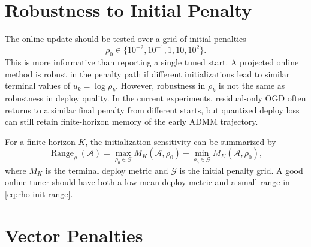 \documentclass[11pt]{article}
\begin{document}
\section{Robustness to Initial Penalty}

The online update should be tested over a grid of initial penalties
\[
    \rho_0\in\{10^{-2},10^{-1},1,10,10^2\}.
\]
This is more informative than reporting a single tuned start.  A projected
online method is robust in the penalty path if different initializations lead
to similar terminal values of \(u_k=\log\rho_k\).  However, robustness in
\(\rho_k\) is not the same as robustness in deploy quality.  In the current
experiments, residual-only OGD often returns to a similar final penalty from
different starts, but quantized deploy loss can still retain finite-horizon
memory of the early ADMM trajectory.

For a finite horizon \(K\), the initialization sensitivity can be summarized by
\begin{equation}
    \operatorname{Range}_\rho(\mathcal A)
    =
    \max_{\rho_0\in\mathcal G}
    M_K(\mathcal A,\rho_0)
    -
    \min_{\rho_0\in\mathcal G}
    M_K(\mathcal A,\rho_0),
    \label{eq:rho-init-range}
\end{equation}
where \(M_K\) is the terminal deploy metric and \(\mathcal G\) is the initial
penalty grid.  A good online tuner should have both a low mean deploy metric
and a small range in \eqref{eq:rho-init-range}.

\section{Vector Penalties}
\end{document}

